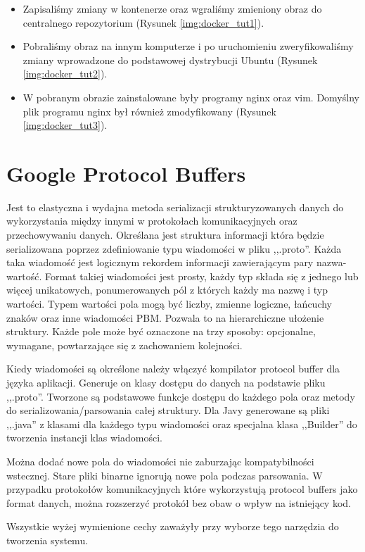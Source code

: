 \begin{itemize}
\item Zapisaliśmy zmiany w kontenerze oraz wgraliśmy zmieniony obraz do centralnego repozytorium (Rysunek \ref{img:docker_tut1}). 



\item Pobraliśmy obraz na innym komputerze i po uruchomieniu zweryfikowaliśmy zmiany wprowadzone do podstawowej dystrybucji Ubuntu (Rysunek \ref{img:docker_tut2}). 

\item W pobranym obrazie zainstalowane były programy nginx oraz vim. Domyślny plik programu nginx był również zmodyfikowany (Rysunek \ref{img:docker_tut3}).


\end{itemize}

\section{Google Protocol Buffers} \label{protobuf}

\par{Jest to elastyczna i wydajna metoda serializacji strukturyzowanych danych do wykorzystania między innymi w protokołach komunikacyjnych oraz przechowywaniu danych. Określana jest struktura informacji która będzie serializowana poprzez zdefiniowanie typu wiadomości w pliku ,,.proto''. Każda taka wiadomość jest logicznym rekordem informacji zawierającym pary nazwa-wartość. Format takiej wiadomości jest prosty, każdy typ składa się z jednego lub więcej unikatowych, ponumerowanych pól z których każdy ma nazwę i typ wartości. Typem wartości pola mogą być liczby, zmienne logiczne, łańcuchy znaków oraz inne wiadomości PBM. Pozwala to na hierarchiczne ułożenie struktury. Każde pole może być oznaczone na trzy sposoby: opcjonalne, wymagane, powtarzające się z zachowaniem kolejności.}

\par{Kiedy wiadomości są określone należy włączyć kompilator protocol buffer dla języka aplikacji. Generuje on klasy dostępu do danych na podstawie pliku ,,.proto''. Tworzone są podstawowe funkcje dostępu do każdego pola oraz metody do serializowania/parsowania całej struktury. Dla Javy generowane są pliki ,,.java'' z klasami dla każdego typu wiadomości oraz specjalna klasa ,,Builder'' do tworzenia instancji klas wiadomości.}

\par{Można dodać nowe pola do wiadomości nie zaburzając kompatybilności wstecznej. Stare pliki binarne ignorują nowe pola podczas parsowania. W przypadku protokołów komunikacyjnych które wykorzystują protocol buffers jako format danych, można rozszerzyć protokół bez obaw o wpływ na istniejący kod.}

\par{Wszystkie wyżej wymienione cechy zaważyły przy wyborze tego narzędzia do tworzenia systemu.}
